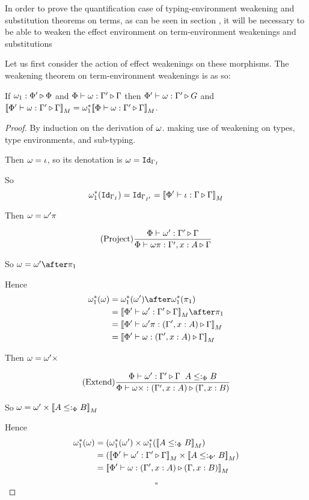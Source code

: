 \documentclass{Report}
\begin{document}
In order to prove the quantification case of typing-environment weakening and substitution theorems on terms, as can be seen in section , it will be necessary to be able to weaken the effect environment on term-environment weakenings and substitutions

Let us first consider the action of effect weakenings on these morphisms. The weakening theorem on term-environment weakenings is as so:


\begin{theorem}
    If $\omega_1 : \Phi' \triangleright \Phi$ and $\Phi\vdash \omega : \Gamma' \triangleright \Gamma$ then $\Phi'\vdash \omega : \Gamma' \triangleright G$ and ${\bf [\![}\Phi'\vdash \omega : \Gamma' \triangleright \Gamma{\bf ]\!]}_M = \omega_1^*{\bf [\![}\Phi\vdash \omega : \Gamma' \triangleright \Gamma{\bf ]\!]}_M$.
\end{theorem}

\begin{proof}
    By induction on the derivation of $\omega$. making use of weakening on types, type environments, and sub-typing.

    Then $\omega = \iota$, so its denotation is $\omega = \texttt{Id}_{\Gamma_I}$
    
    So
    \begin{equation}
      \omega_1^*(\texttt{Id}_{\Gamma_I}) = \texttt{Id}_{\Gamma_{I'}} = {\bf [\![}\Phi'\vdash \iota : \Gamma \triangleright \Gamma{\bf ]\!]}_M  
    \end{equation}
    
    Then $\omega = \omega'\pi$
    
    \begin{equation}
        (\text{Project}) \frac{\Phi\vdash \omega' : \Gamma' \triangleright \Gamma}{\Phi\vdash \omega\pi : \Gamma',x:A \triangleright \Gamma}
    \end{equation}
    
    So $\w = \w'\after\p$
    
    Hence
    \begin{align}
        \w_1\star(\w) &= \w_1\star(\w')\after\w_1\star(\p)\\
        & = \deno{\ewrel{\P'}{\w'}{\G'}{\G}}\after\p\\
        & = \deno{\ewrel{\P'}{\w'\pi}{(\G',x:A)}{\G}}\\
        & = \deno{\ewrel{\P'}{\w}{(\G', x:A)}{\G}}
    \end{align}
    
    Then $\omega = \omega'\times$
    
    \begin{equation}
        (\text{Extend}) \frac{\Phi\vdash \omega' : \Gamma' \triangleright \Gamma\;\; A\leq:_\Phi B}{\Phi\vdash \omega\times : (\Gamma',x:A) \triangleright (\Gamma, x:B)}
    \end{equation}
    
    So $\omega = \omega'\times{\bf [\![}A\leq:_\Phi B{\bf ]\!]}_M$
    
    Hence
    \begin{align}
        \w_1\star(\w) &=(\w_1\star(\w')\times\w_1\star(\deno{A\subtypep B})\\
        & = (\deno{\ewrel{\P'}{\w'}{\G'}{\G}}\times\deno{A\subtypepp B})\\
        & = \deno{\ewrel{\P'}{\w}{(\G',x:A)}{(\G,x:B)}}
    \end{align}

    $$\square$$
\end{proof}
\end{document}
